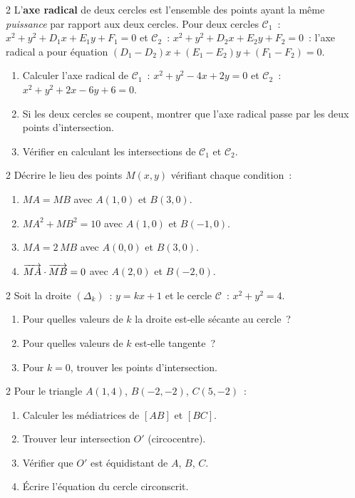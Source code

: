 \begin{exo}{2}
L'\textbf{axe radical} de deux cercles est l'ensemble des points ayant
la m\^eme \emph{puissance} par rapport aux deux cercles.
Pour deux cercles $\mathcal{C}_1$~: $x^2+y^2+D_1x+E_1y+F_1=0$
et $\mathcal{C}_2$~: $x^2+y^2+D_2x+E_2y+F_2=0$~:
l'axe radical a pour \'equation $(D_1-D_2)x+(E_1-E_2)y+(F_1-F_2)=0$.
\begin{enumerate}
  \item Calculer l'axe radical de $\mathcal{C}_1$~: $x^2+y^2-4x+2y=0$
        et $\mathcal{C}_2$~: $x^2+y^2+2x-6y+6=0$.
  \item Si les deux cercles se coupent, montrer que l'axe radical passe par
        les deux points d'intersection.
  \item V\'erifier en calculant les intersections de $\mathcal{C}_1$ et $\mathcal{C}_2$.
\end{enumerate}
\end{exo}

\begin{exo}{2}
D\'ecrire le lieu des points $M(x,y)$ v\'erifiant chaque condition~:
\begin{enumerate}
  \item $MA = MB$ avec $A(1,0)$ et $B(3,0)$.
  \item $MA^2 + MB^2 = 10$ avec $A(1,0)$ et $B(-1,0)$.
  \item $MA = 2\,MB$ avec $A(0,0)$ et $B(3,0)$.
  \item $\overrightarrow{MA}\cdot\overrightarrow{MB}=0$ avec $A(2,0)$ et $B(-2,0)$.
\end{enumerate}
\end{exo}

\begin{exo}{2}
Soit la droite $(\Delta_k)$~: $y=kx+1$ et le cercle $\mathcal{C}$~: $x^2+y^2=4$.
\begin{enumerate}
  \item Pour quelles valeurs de $k$ la droite est-elle s\'ecante au cercle~?
  \item Pour quelles valeurs de $k$ est-elle tangente~?
  \item Pour $k=0$, trouver les points d'intersection.
\end{enumerate}
\end{exo}

\begin{exo}{2}
Pour le triangle $A(1,4)$, $B(-2,-2)$, $C(5,-2)$~:
\begin{enumerate}
  \item Calculer les m\'ediatrices de $[AB]$ et $[BC]$.
  \item Trouver leur intersection $O'$ (circocentre).
  \item V\'erifier que $O'$ est \'equidistant de $A$, $B$, $C$.
  \item \'Ecrire l'\'equation du cercle circonscrit.
\end{enumerate}
\end{exo}

